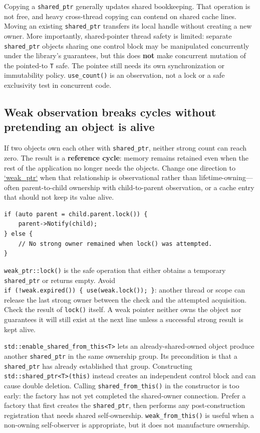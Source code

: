 Copying a \texttt{shared\_ptr} generally updates shared bookkeeping. That operation is not free, and heavy cross-thread copying can contend on shared cache lines. Moving an existing \texttt{shared\_ptr} transfers its local handle without creating a new owner. More importantly, shared-pointer thread safety is limited: separate \texttt{shared\_ptr} objects sharing one control block may be manipulated concurrently under the library's guarantees, but this does \textbf{not} make concurrent mutation of the pointed-to \texttt{T} safe. The pointee still needs its own synchronization or immutability policy. \texttt{use\_count()} is an observation, not a lock or a safe exclusivity test in concurrent code.

\subsection{Weak observation breaks cycles without pretending an object is alive}\label{05-engine-i-ch004-weak-observation-breaks-cycles-without-pretending-an-object-is-alive}

If two objects own each other with \texttt{shared\_ptr}, neither strong count can reach zero. The result is a \textbf{reference cycle}: memory remains retained even when the rest of the application no longer needs the objects. Change one direction to \hyperref[appendix-b9548675eb2b]{`weak\_ptr`} when that relationship is observational rather than lifetime-owning---often parent-to-child ownership with child-to-parent observation, or a cache entry that should not keep its value alive.

\begin{verbatim}
if (auto parent = child.parent.lock()) {
    parent->Notify(child);
} else {
    // No strong owner remained when lock() was attempted.
}
\end{verbatim}

\texttt{weak\_ptr::lock()} is the safe operation that either obtains a temporary \texttt{shared\_ptr} or returns empty. Avoid \texttt{if\ (!weak.expired())\ \{\ use(weak.lock());\ \}}: another thread or scope can release the last strong owner between the check and the attempted acquisition. Check the result of \texttt{lock()} itself. A weak pointer neither owns the object nor guarantees it will still exist at the next line unless a successful strong result is kept alive.

\texttt{std::enable\_shared\_from\_this\textless{}T\textgreater{}} lets an already-shared-owned object produce another \texttt{shared\_ptr} in the same ownership group. Its precondition is that a \texttt{shared\_ptr} has already established that group. Constructing \texttt{std::shared\_ptr\textless{}T\textgreater{}(this)} instead creates an independent control block and can cause double deletion. Calling \texttt{shared\_from\_this()} in the constructor is too early: the factory has not yet completed the shared-owner connection. Prefer a factory that first creates the \texttt{shared\_ptr}, then performs any post-construction registration that needs shared self-ownership. \texttt{weak\_from\_this()} is useful when a non-owning self-observer is appropriate, but it does not manufacture ownership.

